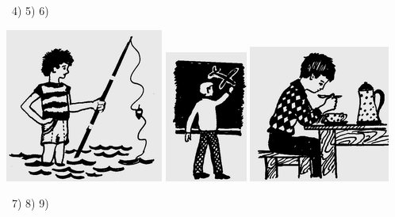 \documentclass[a5paper]{article}
\begin{document}
\ 4) 5) 6)

 \includegraphics[width=2.0417in,height=1.9898in]{MuhammadBagauddinlatinized-img298.png}   \includegraphics[width=1.0626in,height=1.698in]{MuhammadBagauddinlatinized-img299.png}   \includegraphics[width=1.8228in,height=1.7709in]{MuhammadBagauddinlatinized-img300.png} 

\ 7) 8) 9)
\end{document}
